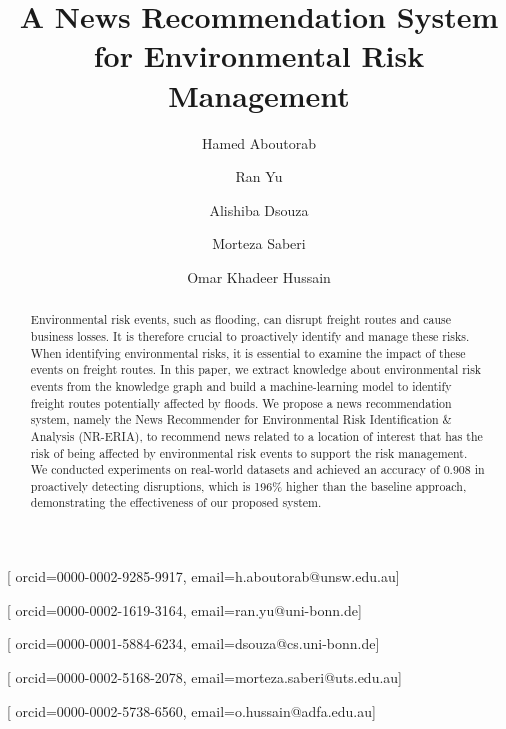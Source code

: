 \documentclass[]{ceurart}
\begin{document}




\title{A News Recommendation System for
Environmental Risk Management}

\tnotemark[1]

\author[1]{Hamed Aboutorab}[%
orcid=0000-0002-9285-9917,
email=h.aboutorab@unsw.edu.au]
\cormark[1]
\address[1]{University of New South Wales, Canberra, Australia }

\author[2]{Ran Yu}[%
orcid=0000-0002-1619-3164,
email=ran.yu@uni-bonn.de]


\author[2]{Alishiba Dsouza}[%
orcid=0000-0001-5884-6234,
email=dsouza@cs.uni-bonn.de]
\address[2]{Data Science \& Intelligent Systems Group (DSIS), University of Bonn, Bonn, Germany}


\author[3]{Morteza Saberi}[%
orcid=0000-0002-5168-2078,
email=morteza.saberi@uts.edu.au]
\address[3]{University of Technology Sydney, Sydney, Australia}

\author[1]{Omar Khadeer Hussain}[%
orcid=0000-0002-5738-6560,
email=o.hussain@adfa.edu.au]



\begin{abstract}
Environmental risk events, such as flooding, can disrupt freight routes and cause business losses. It is therefore crucial to proactively identify and manage these risks. When identifying environmental risks, it is essential to examine the impact of these events on freight routes. In this paper, we extract knowledge about environmental risk events from the knowledge graph and build a machine-learning model to identify freight routes potentially affected by floods. We propose a news recommendation system, namely the News Recommender for Environmental Risk Identification \& Analysis (NR-ERIA), to recommend news related to a location of interest that has the risk of being affected by environmental risk events to support the risk management.
We conducted experiments on real-world datasets and achieved an accuracy of 0.908 in proactively detecting disruptions, which is 196\% higher than the baseline approach, demonstrating the effectiveness of our proposed system.

\end{abstract}
\end{document}

